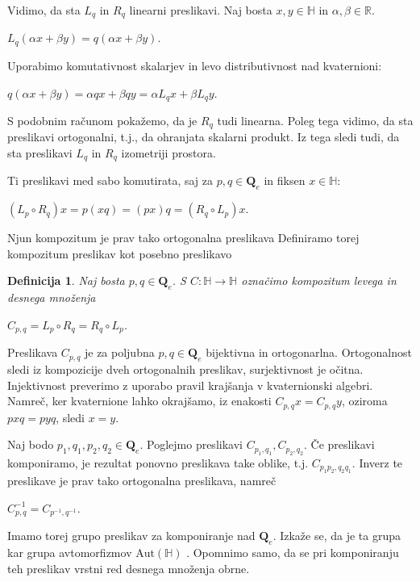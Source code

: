 \documentclass[a4paper,12pt]{article}
\def\R{\mathbb{R}} %
\def\H{\mathbb{H}} %
\def\Qe{\textbf{Q}_{e}} %
\newtheorem{definicija}{Definicija}
\begin{document}
\noindent Vidimo, da sta $L_{q}$ in $R_{q}$ linearni preslikavi. Naj bosta $x,y \in \H$ in $\alpha, \beta \in \R$.
\begin{center}
   $L_{q}(\alpha x +\beta y) = q(\alpha x +\beta y)$.
\end{center}
Uporabimo komutativnost skalarjev in levo distributivnost nad kvaternioni:
\begin{center}
   $q(\alpha x +\beta y) = \alpha qx + \beta qy = \alpha L_{q}x + \beta L_{q}y$.
\end{center}
S podobnim računom pokažemo, da je $R_{q}$ tudi linearna. Poleg tega vidimo, da sta preslikavi ortogonalni,
t.j., da ohranjata skalarni produkt. Iz tega sledi tudi, da sta preslikavi $L_{q}$ in $R_{q}$ izometriji prostora.

\newpage
Ti preslikavi med sabo komutirata, saj za $p,q \in \Qe$ in fiksen $x \in \H$:
\begin{center}
   $(L_{p} \circ R_{q})x = p(xq) = (px)q = (R_{q} \circ L_{p})x$.
\end{center}
Njun kompozitum je prav tako ortogonalna preslikava
Definiramo torej kompozitum preslikav kot posebno preslikavo
\begin{definicija}
Naj bosta $p,q \in \Qe$. S $C: \H \to \H$ označimo kompozitum levega in desnega množenja
\begin{center}
   $C_{p,q} = L_{p} \circ R_{q} = R_{q} \circ L_{p}$.
\end{center}
\end{definicija}
Preslikava $C_{p,q}$ je za poljubna $p,q \in \Qe$ bijektivna in ortogonarlna. Ortogonalnost sledi iz kompozicije dveh ortogonalnih preslikav,
surjektivnost je očitna. Injektivnost preverimo z uporabo pravil krajšanja v kvaternionski algebri.
Namreč, ker kvaternione lahko okrajšamo, iz enakosti $C_{p,q}x = C_{p,q}y$, oziroma $pxq = pyq$, sledi $x = y$.

Naj bodo $p_1, q_1, p_2, q_2 \in \Qe$. Poglejmo preslikavi $C_{p_1, q_1}, C_{p_2,q_2}$. Če preslikavi komponiramo, je rezultat ponovno preslikava take oblike, t.j.
$C_{p_1 p_2, q_2 q_1}$. Inverz te preslikave je prav tako ortogonalna preslikava, namreč
\begin{center}
   $C^{-1}_{p,q} = C_{p^{-1}, q^{-1}}.$
\end{center} 
Imamo torej grupo preslikav za komponiranje nad $\Qe$. Izkaže se, da je ta grupa kar grupa avtomorfizmov $\text{Aut} ( \H )$ \cite{brevsar2018skolem}.
Opomnimo samo, da se pri komponiranju teh preslikav vrstni red desnega množenja obrne.
\end{document}
